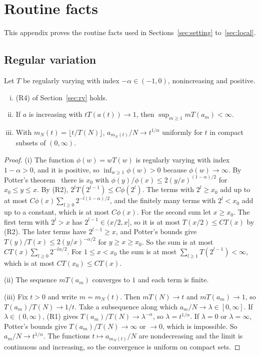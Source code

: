 \section{Routine facts}\label{app:routine}

This appendix proves the routine facts used in Sections~\ref{sec:setting} to~\ref{sec:local}.

\subsection{Regular variation}

\begin{lemma}\label{lem:rv-facts}
Let $T$ be regularly varying with index $-\alpha\in(-1,0)$, nonincreasing and positive.
\begin{enumerate}[(i)]
\item (R4) of Section~\ref{sec:rv} holds.
\item If $a$ is increasing with $tT(a(t))\to1$, then $\sup_{m\ge1}mT(a_m)<\infty$.
\item With $m_N(t)=\lfloor t/T(N)\rfloor$, $a_{m_N(t)}/N\to t^{1/\alpha}$ uniformly for $t$ in compact
subsets of $(0,\infty)$.
\end{enumerate}
\end{lemma}

\begin{proof}
(i) The function $\phi(w)=wT(w)$ is regularly varying with index $1-\alpha>0$, and it is
positive, so $\inf_{w\ge1}\phi(w)>0$ because $\phi(w)\to\infty$. By Potter's
theorem~\cite[Theorem~1.5.6]{bgt1989} there is
$x_0$ with $\phi(y)/\phi(x)\le2(y/x)^{(1-\alpha)/2}$ for $x_0\le y\le x$. By (R2),
$2^lT(2^{l-1})\le C\phi(2^l)$. The terms with $2^l\ge x_0$ add up to at most
$C\phi(x)\sum_{l\ge0}2^{-l(1-\alpha)/2}$, and the finitely many terms with $2^l<x_0$ add up to a
constant, which is at most $C\phi(x)$. For the second sum let $x\ge x_0$. The first term
with $2^l>x$ has $2^{l-1}\in(x/2,x]$, so it is at most $T(x/2)\le CT(x)$ by (R2). The later
terms have $2^{l-1}\ge x$, and Potter's bounds give $T(y)/T(x)\le2(y/x)^{-\alpha/2}$ for
$y\ge x\ge x_0$. So the sum is at most $CT(x)\sum_{l\ge0}2^{-l\alpha/2}$. For $1\le x<x_0$ the sum is at most
$\sum_{l\ge1}T(2^{l-1})<\infty$, which is at most $CT(x_0)\le CT(x)$.

(ii) The sequence $mT(a_m)$ converges to $1$ and each term is finite.

(iii) Fix $t>0$ and write $m=m_N(t)$. Then $mT(N)\to t$ and $mT(a_m)\to1$, so
$T(a_m)/T(N)\to1/t$. Take a subsequence along which $a_m/N\to\lambda\in[0,\infty]$. If
$\lambda\in(0,\infty)$, (R1) gives $T(a_m)/T(N)\to\lambda^{-\alpha}$, so $\lambda=t^{1/\alpha}$. If
$\lambda=0$ or $\lambda=\infty$, Potter's bounds give $T(a_m)/T(N)\to\infty$ or $\to0$, which is
impossible. So $a_m/N\to t^{1/\alpha}$. The functions $t\mapsto a_{m_N(t)}/N$ are nondecreasing and
the limit is continuous and increasing, so the convergence is uniform on compact sets.
\end{proof}

